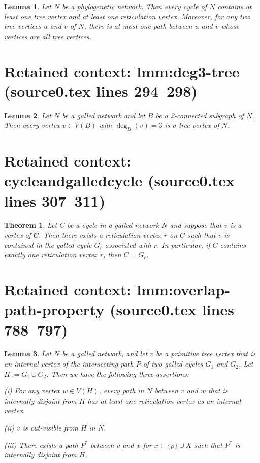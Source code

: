 \documentclass[10pt,a4paper]{amsart}
\theoremstyle{plain}
\theoremstyle{thmstyleone}
\newtheorem{theorem}{Theorem}
\theoremstyle{thmstyletwo}
\newtheorem{lemma}{Lemma}
\theoremstyle{thmstylethree}
\begin{document}
\begin{lemma}\label{lmm:cycle}
Let $N$ be a phylogenetic network. Then every cycle of $N$ contains at least one tree vertex and at least one reticulation vertex. Moreover, for any two tree vertices $u$ and $v$ of $N$, there is at most one path between $u$ and $v$ whose vertices are all tree vertices.
\end{lemma}


\section*{Retained context: lmm:deg3-tree (source0.tex lines 294--298)}

\begin{lemma}\label{lmm:deg3-tree}
Let $N$ be a galled network and let $B$ be a 2-connected subgraph of 
$\overline{N}$. Then every vertex 
$v \in V(B)$ with $\deg_B(v) = 3$ is a tree vertex of $N$.
\end{lemma}


\section*{Retained context: cycleandgalledcycle (source0.tex lines 307--311)}

\begin{theorem}\label{cycleandgalledcycle}
Let $C$ be a cycle in a galled network $N$ and suppose that $v$ is a vertex of $C$. Then there exists a reticulation vertex $r$ on $C$ such that $v$ is contained in the galled cycle $G_r$ associated with $r$. 
In particular, if $C$ contains exactly one reticulation vertex $r$, then 
$C=G_r$.
\end{theorem}


\section*{Retained context: lmm:overlap-path-property (source0.tex lines 788--797)}

\begin{lemma}\label{lmm:overlap-path-property}
Let $N$ be a galled network, and let $v$ be a primitive tree vertex that is an internal vertex of the intersecting path $P$ of two galled cycles $G_1$ and $G_2$. Let $H := G_1 \cup G_2$. Then we have the following three assertions:

(i) For any vertex $w \in V(H)$, every path in $N$ between $v$ and $w$ that is internally disjoint from $H$ has at least one reticulation vertex as an internal vertex.

(ii) $v$ is cut-visible from $H$ in $\overline{N}$.

(iii) There exists a path $P^*$ between $v$ and $x$ for $x\in \{\rho\}\cup X$ such that $P^*$ is internally disjoint from $H$.

\end{lemma}
\end{document}
